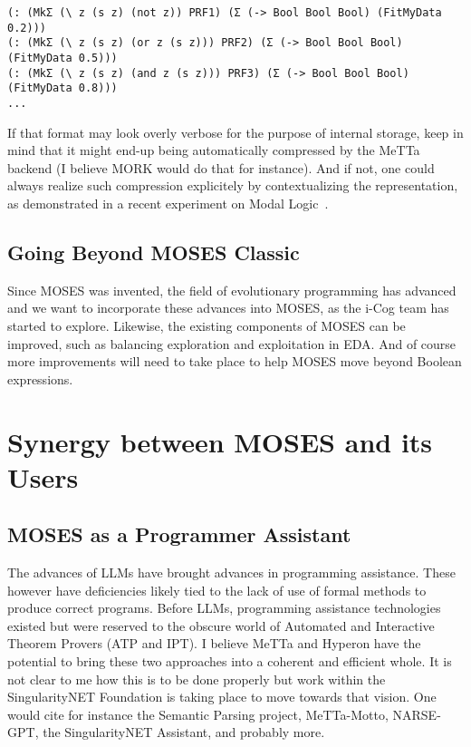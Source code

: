 \documentclass[]{report}
\begin{document}
\begin{footnotesize}
\begin{verbatim}
(: (MkΣ (\ z (s z) (not z)) PRF1) (Σ (-> Bool Bool Bool) (FitMyData 0.2)))
(: (MkΣ (\ z (s z) (or z (s z))) PRF2) (Σ (-> Bool Bool Bool) (FitMyData 0.5)))
(: (MkΣ (\ z (s z) (and z (s z))) PRF3) (Σ (-> Bool Bool Bool) (FitMyData 0.8)))
...
\end{verbatim}
\end{footnotesize}
If that format may look overly verbose for the purpose of internal
storage, keep in mind that it might end-up being automatically
compressed by the MeTTa backend (I believe MORK would do that for
instance).  And if not, one could always realize such compression
explicitely by contextualizing the representation, as demonstrated in
a recent experiment on Modal Logic~\cite{ModalLogic}.

\subsection{Going Beyond MOSES Classic}

Since MOSES was invented, the field of evolutionary programming has
advanced and we want to incorporate these advances into MOSES, as the
i-Cog team has started to explore.  Likewise, the existing components
of MOSES can be improved, such as balancing exploration and
exploitation in EDA.  And of course more improvements will need to
take place to help MOSES move beyond Boolean expressions.

\section{Synergy between MOSES and its Users}

\subsection{MOSES as a Programmer Assistant}

The advances of LLMs have brought advances in programming assistance.
These however have deficiencies likely tied to the lack of use of
formal methods to produce correct programs.  Before LLMs, programming
assistance technologies existed but were reserved to the obscure world
of Automated and Interactive Theorem Provers (ATP and IPT).  I believe
MeTTa and Hyperon have the potential to bring these two approaches
into a coherent and efficient whole.  It is not clear to me how this
is to be done properly but work within the SingularityNET Foundation
is taking place to move towards that vision.  One would cite for
instance the Semantic Parsing project, MeTTa-Motto, NARSE-GPT, the
SingularityNET Assistant, and probably more.
\end{document}
